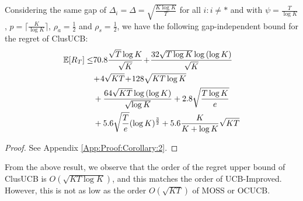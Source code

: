 \begin{corollary}
\label{Result:Corollary:2}
Considering the same gap of $\Delta_{i} = \Delta =\sqrt{\frac{K\log K}{T}}$ for all ${i:i\neq *}$ and with $\psi=\frac{T}{\log K}$, $p=\big\lceil\frac{K}{\log K}\big\rceil$, $\rho_{a}=\frac{1}{2}$ and $\rho_{s}=\frac{1}{2}$, 
 we have the following gap-independent bound for the regret of ClusUCB:
\begin{align*}
 \mathbb{E}[R_{T}]\le & 70.8\frac{\sqrt{T}\log K}{\sqrt{K}} \!+\! \frac{32\sqrt{T\log K}\log{(\log K)}}{\sqrt{K}}\\
  &\!+\! 4\sqrt{KT} \!+\! 128\sqrt{KT\log K}\\
	& + \frac{64\sqrt{KT}\log{(\log K)}}{\sqrt{\log K}} + 2.8\sqrt{\frac{T\log K}{e}}\\
	& + 5.6\sqrt{\frac{T}{e}}(\log K)^{\frac{3}{2}} + 5.6 \frac{K}{K+\log K}\sqrt{KT}
\end{align*}
\end{corollary}
\begin{proof}
 See Appendix \ref{App:Proof:Corollary:2}.
\end{proof}


From the above result, we observe that the order of the regret upper bound of ClusUCB is $O(\sqrt{KT\log K})$, and this matches the order of UCB-Improved. However, this is not as low as the order $O(\sqrt{KT})$ of MOSS or OCUCB. 

